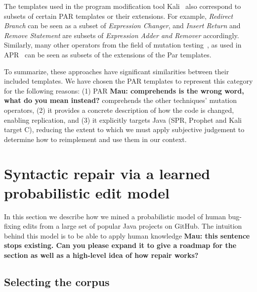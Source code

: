 \documentclass[conference]{IEEEtran}
\newcommand{\todo}[1]
  {{\scriptsize \textbf{\color{red} {#1}}}}
\begin{document}
The templates used in the program modification tool Kali~\cite{Qi15}
also correspond to subsets of certain PAR templates or their extensions. 
For example, \emph{Redirect Branch} can be seen as
a subset of \emph{Expression Changer}, and \emph{Insert Return} and \emph{Remove Statement} are
subsets of \emph{Expression Adder and Remover} accordingly. Similarly,
many other operators from the field of mutation testing~\cite{Offutt06}, as used in
APR~\cite{debroy10,xuan16} can be seen as subsets of the extensions of the 
Par templates.  

To summarize, these approaches have significant similarities between their
included templates.  We have chosen the PAR templates to represent this category
for the following reasons: (1) PAR \todo{Mau: comprehends is the wrong word, what do you mean
  instead?} comprehends the other techniques' mutation operators, (2) it
provides a concrete description of how the code is changed, enabling
replication, and (3) it explicitly targets Java (SPR, Prophet and Kali
target C), reducing the extent to which we must apply subjective judgement to
determine how to reimplement and use them in our context.

\section{Syntactic repair via a learned probabilistic edit model} \label{buildingTheModel}

In this section we describe how we mined a probabilistic
model of human bug-fixing edits from a large set of popular Java projects on
GitHub. The intuition behind this model is to be able to apply human
knowledge\todo{Mau: this sentence stops existing. Can you please expand it to
  give a roadmap for the section as well as a high-level idea of how repair works?}

\subsection{Selecting the corpus}
\end{document}
